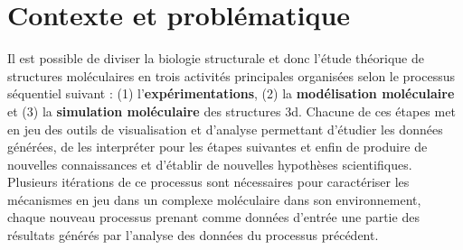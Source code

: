 



\section*{Contexte et problématique}

Il est possible de diviser la biologie structurale et donc l'étude théorique de structures moléculaires en trois activités principales organisées selon le processus séquentiel suivant : (1) l'\textbf{expérimentations}, (2) la \textbf{modélisation moléculaire} et (3) la \textbf{simulation moléculaire} des structures 3d. Chacune de ces étapes met en jeu des outils de visualisation et d'analyse permettant d'étudier les données générées, de les interpréter pour les étapes suivantes et enfin de produire de nouvelles connaissances et d'établir de nouvelles hypothèses scientifiques. Plusieurs itérations de ce processus sont nécessaires pour caractériser les mécanismes en jeu dans un complexe moléculaire dans son environnement, chaque nouveau processus prenant comme données d'entrée une partie des résultats générés par l'analyse des données du processus précédent.

